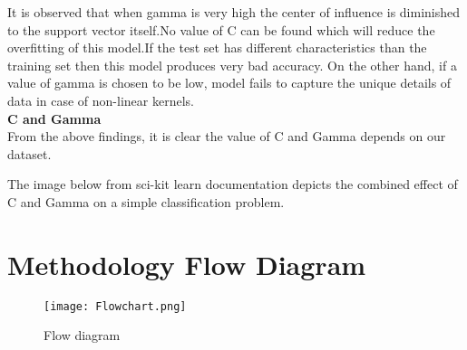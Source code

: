 \documentclass{report}
\begin{document}
It is observed that when gamma is very high the center of influence is diminished to the support vector itself.No value of C can be found which will reduce the overfitting of this model.If the test set has different characteristics than the training set then this model produces very bad accuracy.
On the other hand, if a value of gamma is chosen to be low, model fails to capture the unique details of data in case of non-linear kernels.\\ \linebreak
\linebreak
\textbf{C and Gamma}\\
\linebreak
From the above findings, it is clear the value of C and Gamma depends on our dataset.

The image below from sci-kit learn documentation depicts the combined effect of C and Gamma on a simple classification problem.\\
\pagebreak
\pagebreak
\pagebreak
{}
\section{\Huge Methodology Flow Diagram}
\begin{figure}[!h]
  \texttt{[image: Flowchart.png]}
  \caption{Flow diagram}
  \label{Fig:2}
\end{figure}
\pagebreak
\end{document}
